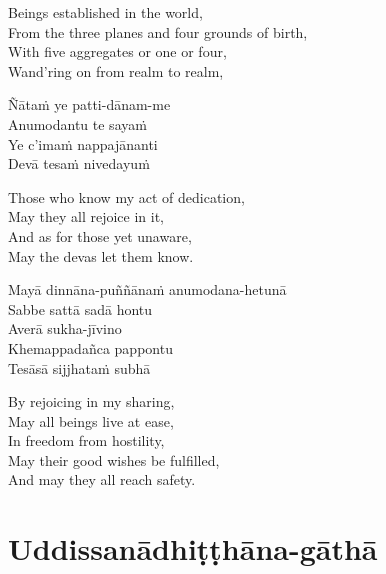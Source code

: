 \begin{english}
  Beings established in the world,\\
  From the three planes and four grounds of birth,\\
  With five aggregates or one or four,\\
  Wand'ring on from realm to realm,
\end{english}

Ñātaṁ ye patti-dānam-me\\
Anumodantu te sayaṁ\\
Ye c'imaṁ nappajānanti\\
Devā tesaṁ nivedayuṁ

\enlargethispage{\baselineskip}

\begin{english}
  Those who know my act of dedication,\\
  May they all rejoice in it,\\
  And as for those yet unaware,\\
  May the devas let them know.
\end{english}

Mayā dinnāna-puññānaṁ anumodana-hetunā\\
Sabbe sattā sadā hontu\\
Averā sukha-jīvino\\
Khemappadañca pappontu\\
Tesāsā sijjhataṁ subhā

\begin{english}
  By rejoicing in my sharing,\\
  May all beings live at ease,\\
  In freedom from hostility,\\
  May their good wishes be fulfilled,\\
  And may they all reach safety.
\end{english}

\section{Uddissanādhiṭṭhāna-gāthā}

\enlargethispage{\baselineskip}

\begin{leader}
\end{leader}


